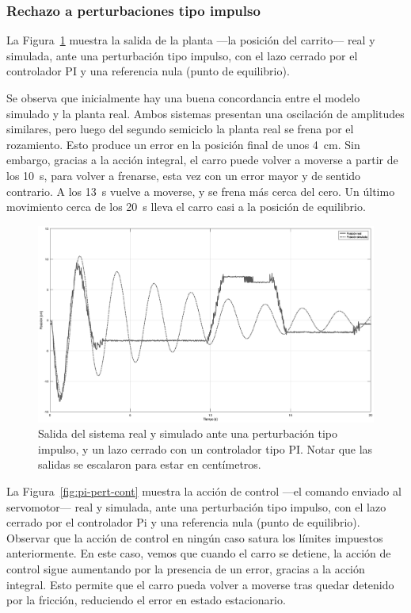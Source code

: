 \subsubsection{Rechazo a perturbaciones tipo impulso}

La Figura~\ref{fig:pi-pert-salida} muestra la salida de la planta ---la posición del carrito--- real y simulada, ante una perturbación tipo impulso, con el lazo cerrado por el controlador PI y una referencia nula (punto de equilibrio).

Se observa que inicialmente hay una buena concordancia entre el modelo simulado y la planta real. Ambos sistemas presentan una oscilación de amplitudes similares, pero luego del segundo semiciclo la planta real se frena por el rozamiento. Esto produce un error en la posición final de unos \qty{4}{\cm}. Sin embargo, gracias a la acción integral, el carro puede volver a moverse a partir de los \qty{10}{\s}, para volver a frenarse, esta vez con un error mayor y de sentido contrario. A los \qty{13}{\s} vuelve a moverse, y se frena más cerca del cero. Un último movimiento cerca de los \qty{20}{\s} lleva el carro casi a la posición de equilibrio.

\begin{figure}[!tbp]
    \centering
    \includegraphics[width=\linewidth]{img/pi-pert-salida.eps}
    \caption{Salida del sistema real y simulado ante una perturbación tipo impulso, y un lazo cerrado con un controlador tipo PI. Notar que las salidas se escalaron para estar en centímetros.}
    \label{fig:pi-pert-salida}
\end{figure}

La Figura~\ref{fig:pi-pert-cont} muestra la acción de control ---el comando enviado al servomotor--- real y simulada, ante una perturbación tipo impulso, con el lazo cerrado por el controlador Pi y una referencia nula (punto de equilibrio). Observar que la acción de control en ningún caso satura los límites impuestos anteriormente. En este caso, vemos que cuando el carro se detiene, la acción de control sigue aumentando por la presencia de un error, gracias a la acción integral. Esto permite que el carro pueda volver a moverse tras quedar detenido por la fricción, reduciendo el error en estado estacionario.

